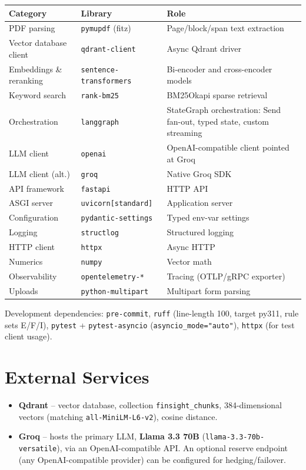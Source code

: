 \documentclass[11pt,a4paper]{report}
\newcommand{\code}[1]{\texttt{#1}}
\begin{document}
\begin{longtable}{@{}p{4cm}p{4cm}p{6.5cm}@{}}
\toprule
\textbf{Category} & \textbf{Library} & \textbf{Role} \\
\midrule
\endhead
PDF parsing & \code{pymupdf} (fitz) & Page/block/span text extraction \\
Vector database client & \code{qdrant-client} & Async Qdrant driver \\
Embeddings \& reranking & \code{sentence-transformers} & Bi-encoder and cross-encoder models \\
Keyword search & \code{rank-bm25} & BM25Okapi sparse retrieval \\
Orchestration & \code{langgraph} & StateGraph orchestration: Send fan-out, typed state, custom streaming \\
LLM client & \code{openai} & OpenAI-compatible client pointed at Groq \\
LLM client (alt.) & \code{groq} & Native Groq SDK \\
API framework & \code{fastapi} & HTTP API \\
ASGI server & \code{uvicorn[standard]} & Application server \\
Configuration & \code{pydantic-settings} & Typed env-var settings \\
Logging & \code{structlog} & Structured logging \\
HTTP client & \code{httpx} & Async HTTP \\
Numerics & \code{numpy} & Vector math \\
Observability & \code{opentelemetry-*} & Tracing (OTLP/gRPC exporter) \\
Uploads & \code{python-multipart} & Multipart form parsing \\
\bottomrule
\end{longtable}

Development dependencies: \code{pre-commit}, \code{ruff} (line-length 100, target
py311, rule sets E/F/I), \code{pytest} + \code{pytest-asyncio}
(\code{asyncio\_mode="auto"}), \code{httpx} (for test client usage).

\section{External Services}

\begin{itemize}
    \item \textbf{Qdrant} -- vector database, collection \code{finsight\_chunks},
    384-dimensional vectors (matching \code{all-MiniLM-L6-v2}), cosine distance.
    \item \textbf{Groq} -- hosts the primary LLM, \textbf{Llama 3.3 70B}
    (\code{llama-3.3-70b-versatile}), via an OpenAI-compatible API. An optional reserve
    endpoint (any OpenAI-compatible provider) can be configured for hedging/failover.
\end{itemize}
\end{document}
